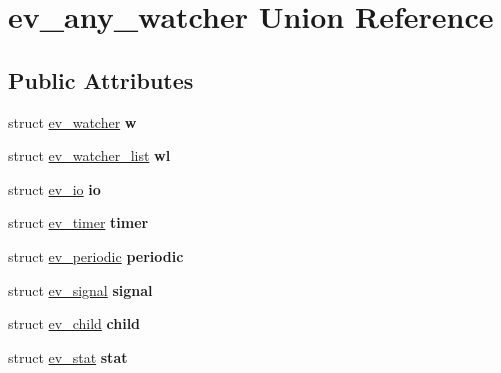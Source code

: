 \hypertarget{unionev__any__watcher}{}\section{ev\+\_\+any\+\_\+watcher Union Reference}
\label{unionev__any__watcher}
\subsection*{Public Attributes}
\begin{DoxyCompactItemize}
\item 
\hypertarget{unionev__any__watcher_a653eb5db584623c06a3c3d55f5d60020}{}\label{unionev__any__watcher_a653eb5db584623c06a3c3d55f5d60020} 
struct \hyperlink{structev__watcher}{ev\+\_\+watcher} {\bfseries w}
\item 
\hypertarget{unionev__any__watcher_a92016edfd8481917f988582d3747f273}{}\label{unionev__any__watcher_a92016edfd8481917f988582d3747f273} 
struct \hyperlink{structev__watcher__list}{ev\+\_\+watcher\+\_\+list} {\bfseries wl}
\item 
\hypertarget{unionev__any__watcher_adf91ee0c0a344e16c3c858a6fe3aacc8}{}\label{unionev__any__watcher_adf91ee0c0a344e16c3c858a6fe3aacc8} 
struct \hyperlink{structev__io}{ev\+\_\+io} {\bfseries io}
\item 
\hypertarget{unionev__any__watcher_ab4660dcfbdcbff80a395deac1b090eac}{}\label{unionev__any__watcher_ab4660dcfbdcbff80a395deac1b090eac} 
struct \hyperlink{structev__timer}{ev\+\_\+timer} {\bfseries timer}
\item 
\hypertarget{unionev__any__watcher_a8b400cd8e29a2a7c997100711e8ee8a3}{}\label{unionev__any__watcher_a8b400cd8e29a2a7c997100711e8ee8a3} 
struct \hyperlink{structev__periodic}{ev\+\_\+periodic} {\bfseries periodic}
\item 
\hypertarget{unionev__any__watcher_a704684338d9105b9a3f1f87e8e48a776}{}\label{unionev__any__watcher_a704684338d9105b9a3f1f87e8e48a776} 
struct \hyperlink{structev__signal}{ev\+\_\+signal} {\bfseries signal}
\item 
\hypertarget{unionev__any__watcher_a60ac726b969a172eaf42e41dcaf54e81}{}\label{unionev__any__watcher_a60ac726b969a172eaf42e41dcaf54e81} 
struct \hyperlink{structev__child}{ev\+\_\+child} {\bfseries child}
\item 
\hypertarget{unionev__any__watcher_a4daa1c06972b03f1e574012ff85f7849}{}\label{unionev__any__watcher_a4daa1c06972b03f1e574012ff85f7849} 
struct \hyperlink{structev__stat}{ev\+\_\+stat} {\bfseries stat}

\end{DoxyCompactItemize}

